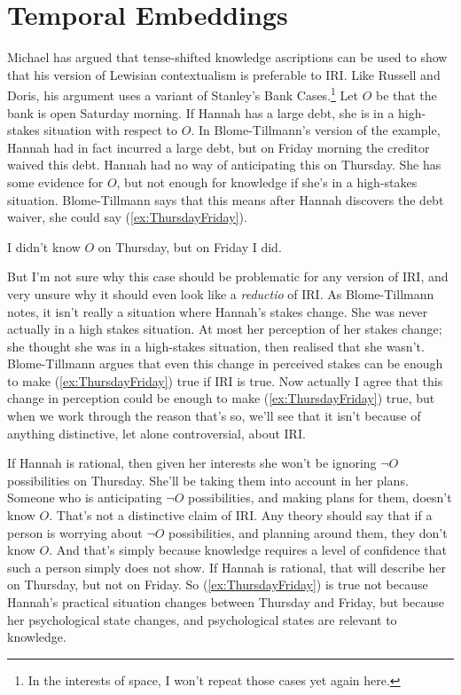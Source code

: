 \documentclass[oneside]{book}
\renewcommand{\numbex}[2]{
\begin{enumerate*}
\setcounter{enumi}{\value{paper}}
\renewcommand{\labelenumi}{(\arabic{enumi})}
#2
\end{enumerate*}
\addtocounter{paper}{#1}}
\begin{document}
\section{Temporal Embeddings} \label{sect:time}

Michael \cite{MBT2009} has argued that tense-shifted knowledge ascriptions can be used to show that his version of Lewisian contextualism is preferable to IRI. Like Russell and Doris, his argument uses a variant of Stanley's Bank Cases.\footnote{In the interests of space, I won't repeat those cases yet again here.} Let $O$ be that the bank is open Saturday morning. If Hannah has a large debt, she is in a high-stakes situation with respect to $O$. In Blome-Tillmann's version of the example, Hannah had in fact incurred a large debt, but on Friday morning the creditor waived this debt. Hannah had no way of anticipating this on Thursday. She has some evidence for $O$, but not enough for knowledge if she's in a high-stakes situation. Blome-Tillmann says that this means after Hannah discovers the debt waiver, she could say (\ref{ex:ThursdayFriday}).

\numbex{1}{
\item \label{ex:ThursdayFriday} I didn't know $O$ on Thursday, but on Friday I did.
}

\noindent But I'm not sure why this case should be problematic for any version of IRI, and very unsure why it should even look like a \textit{reductio} of IRI. As Blome-Tillmann notes, it isn't really a situation where Hannah's stakes change. She was never actually in a high stakes situation. At most her perception of her stakes change; she thought she was in a high-stakes situation, then realised that she wasn't. Blome-Tillmann argues that even this change in perceived stakes can be enough to make (\ref{ex:ThursdayFriday}) true if IRI is true. Now actually I agree that this change in perception could be enough to make (\ref{ex:ThursdayFriday}) true, but when we work through the reason that's so, we'll see that it isn't because of anything distinctive, let alone controversial, about IRI.

If Hannah is rational, then given her interests she won't be ignoring $\neg O$ possibilities on Thursday. She'll be taking them into account in her plans. Someone who is anticipating $\neg O$ possibilities, and making plans for them, doesn't know $O$. That's not a distinctive claim of IRI. Any theory should say that if a person is worrying about $\neg O$ possibilities, and planning around them, they don't know $O$. And that's simply because knowledge requires a level of confidence that such a person simply does not show. If Hannah is rational, that will describe her on Thursday, but not on Friday. So (\ref{ex:ThursdayFriday}) is true not because Hannah's practical situation changes between Thursday and Friday, but because her psychological state changes, and psychological states are relevant to knowledge.
\end{document}
